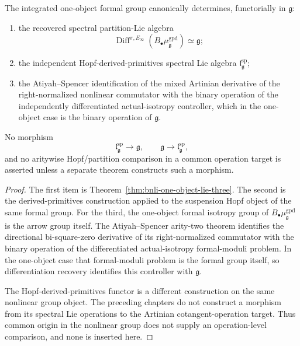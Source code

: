 \begin{theorem}
\label{thm:bnli-hopf-comparison}
The integrated one-object formal group canonically determines, functorially in
$\mathfrak g$:
\begin{enumerate}
    \item the recovered spectral partition-Lie algebra
    \[
        \operatorname{Diff}^{\pi,E_\infty}
        (B_\bullet\mu^{\mathrm{gpd}}_{\mathfrak g})
        \simeq \mathfrak g;
    \]
    \item the independent Hopf-derived-primitives spectral Lie algebra
    $\mathfrak l^{\mathrm{sp}}_{\mathfrak g}$;
    \item the Atiyah--Spencer identification of the mixed Artinian derivative
    of the right-normalized nonlinear commutator with the binary operation of
    the independently differentiated actual-isotropy controller, which in the
    one-object case is the binary operation of $\mathfrak g$.
\end{enumerate}
No morphism
\[
    \mathfrak l^{\mathrm{sp}}_{\mathfrak g}
    \longrightarrow \mathfrak g,
    \qquad
    \mathfrak g\longrightarrow\mathfrak l^{\mathrm{sp}}_{\mathfrak g},
\]
and no aritywise Hopf/partition comparison in a common operation target is
asserted unless a separate theorem constructs such a morphism.
\end{theorem}

\begin{proof}
The first item is Theorem~\ref{thm:bnli-one-object-lie-three}.  The second is
the derived-primitives construction applied to the suspension Hopf object of
the same formal group.  For the third, the one-object formal isotropy group of
$B_\bullet\mu^{\mathrm{gpd}}_{\mathfrak g}$ is the arrow group itself.  The
Atiyah--Spencer arity-two theorem identifies the directional bi-square-zero
derivative of its right-normalized commutator with the binary operation of the
differentiated actual-isotropy formal-moduli problem.  In the one-object case
that formal-moduli problem is the formal group itself, so differentiation
recovery identifies this controller with $\mathfrak g$.

The Hopf-derived-primitives functor is a different construction on the same
nonlinear group object.  The preceding chapters do not construct a morphism
from its spectral Lie operations to the Artinian cotangent-operation target.
Thus common origin in the nonlinear group does not supply an operation-level
comparison, and none is inserted here.
\end{proof}

